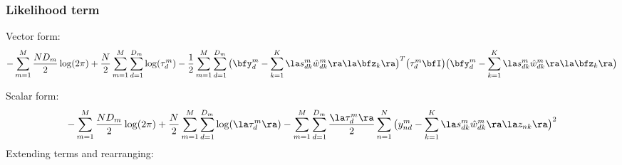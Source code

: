 \documentclass[10pt, a4paper,openany]{report}
\begin{document}
\subsubsection{Likelihood term}
Vector form:
\[
-\sum_{m=1}^M \frac{ND_m}{2} \log(2\pi) + \frac{N}{2}\sum_{m=1}^{M}\sum_{d=1}^{D_m}\log(\tau_d^m) - \frac{1}{2} \sum_{m=1}^{M}\sum_{d=1}^{D_m} \big( \bfy_d^m - \sum_{k=1}^{K}\la s_{dk}^m \hat{w}_{dk}^m \ra \la \bfz_k \ra \big)^T \big( \tau_d^m \bfI \big) \big( \bfy_d^m - \sum_{k=1}^{K}\la s_{dk}^m \hat{w}_{dk}^m \ra \la \bfz_k \ra \big)
\]

Scalar form:
\[
-\sum_{m=1}^M \frac{ND_m}{2} \log(2\pi) + \frac{N}{2} \sum_{m=1}^M \sum_{d=1}^{D_m} \log(\la \tau_d^m \ra) -\sum_{m=1}^M \sum_{d=1}^{D_m} \frac{\la \tau_d^m \ra}{2} \sum_{n=1}^{N} \big( y_{nd}^m - \sum_{k=1}^{K}\la s_{dk}^m \hat{w}_{dk}^m \ra \la z_{nk} \ra \big)^2
\]
Extending terms and rearranging:
\end{document}
